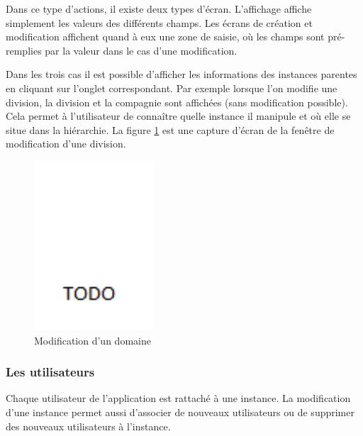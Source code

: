 Dans ce type d'actions, il existe deux types d'écran.
L'affichage affiche simplement les valeurs des différents champs.
Les écrans de création et modification affichent quand à eux une zone de saisie, où les champs sont pré-remplies par la valeur dans le cas d'une modification.

Dans les trois cas il est possible d'afficher les informations des instances parentes en cliquant sur l'onglet correspondant.
Par exemple lorsque l'on modifie une division, la division et la compagnie sont affichées (sans modification possible).
Cela permet à l'utilisateur de connaître quelle instance il manipule et où elle se situe dans la hiérarchie.
La figure \ref{instances_modification} est une capture d'écran de la fenêtre de modification d'une division.
\begin{figure}[!h]
	\center
	\includegraphics[width=0.4\textwidth]{img/instances_modification.png}
	\caption{Modification d'un domaine}
	\label{instances_modification}
\end{figure}


\subsubsection{Les utilisateurs}

Chaque utilisateur de l'application est rattaché à une instance.
La modification d'une instance permet aussi d'associer de nouveaux utilisateurs ou de supprimer des nouveaux utilisateurs à l'instance.

